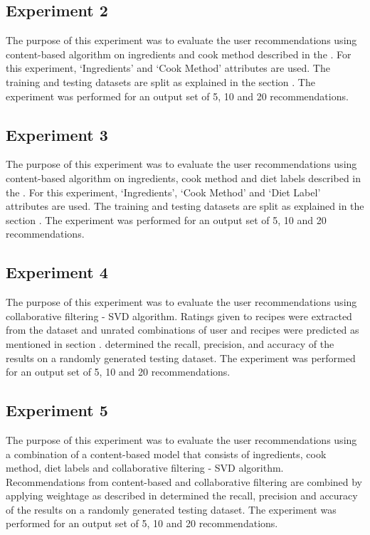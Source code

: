\subsection{Experiment 2}
\label{sec:cb_ingred_cook_method_exp}
The purpose of this experiment was to evaluate the user recommendations using content-based algorithm on ingredients and cook method described in the . For this experiment, \lq{}Ingredients\rq{} and \lq{}Cook Method\rq{} attributes are used. The training and testing datasets are split as explained in the section . The experiment was performed for an output set of 5, 10 and 20 recommendations.

\subsection{Experiment 3}
\label{sec:cb_ingred_cook_method_diet_label_exp}
The purpose of this experiment was to evaluate the user recommendations using content-based algorithm on ingredients, cook method and diet labels described in the . For this experiment, \lq{}Ingredients\rq{}, \lq{}Cook Method\rq{} and \lq{}Diet Label\rq{} attributes are used. The training and testing datasets are split as explained in the section . The experiment was performed for an output set of 5, 10 and 20 recommendations.

\subsection{Experiment 4}
\label{sec:cf_exp}
The purpose of this experiment was to evaluate the user recommendations using collaborative filtering - SVD algorithm. Ratings given to recipes were extracted from the dataset and unrated combinations of user and recipes were predicted as mentioned in section .  determined the recall, precision, and accuracy of the results on a randomly generated testing dataset. The experiment was performed for an output set of 5, 10 and 20 recommendations.

\subsection{Experiment 5}
\label{sec:hybrid_exp}
The purpose of this experiment was to evaluate the user recommendations using a combination of a content-based model that consists of ingredients, cook method, diet labels and collaborative filtering - SVD algorithm. Recommendations from content-based and collaborative filtering are combined by applying weightage as described in 
 determined the recall, precision and accuracy of the results on a randomly generated testing dataset. The experiment was performed for an output set of 5, 10 and 20 recommendations.